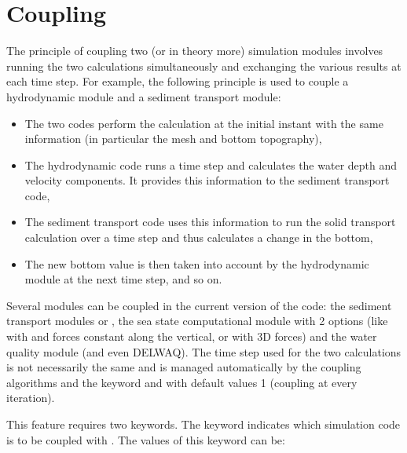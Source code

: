 \section{Coupling}
\label{sec:coupling}

The principle of coupling two (or in theory more) simulation modules involves
running the two calculations simultaneously and exchanging the various results
at each time step.
For example, the following principle is used to couple a hydrodynamic module
and a sediment transport module:

\begin{itemize}
\item The two codes perform the calculation at the initial instant
with the same information (in particular the mesh and bottom topography),

\item The hydrodynamic code runs a time step and calculates the water depth
and velocity components.
It provides this information to the sediment transport code,

\item The sediment transport code uses this information to run the solid
transport calculation over a time step and thus calculates a change in the
bottom,

\item The new bottom value is then taken into account by the hydrodynamic module
at the next time step, and so on.
\end{itemize}

Several modules can be coupled in the current version of the code:
the sediment transport modules \gaia or \sisyphe,
the sea state computational module \tomawac with 2 options (like with
 and forces constant along the vertical, or with 3D forces)
and the water quality module \waqtel (and even DELWAQ).
The time step used for the two calculations is not necessarily the same and is
managed automatically by the coupling algorithms
and the keyword  and
 with default values 1
(coupling at every iteration).

This feature requires two keywords.
The keyword  indicates which simulation code is to be
coupled with .
The values of this keyword can be:

